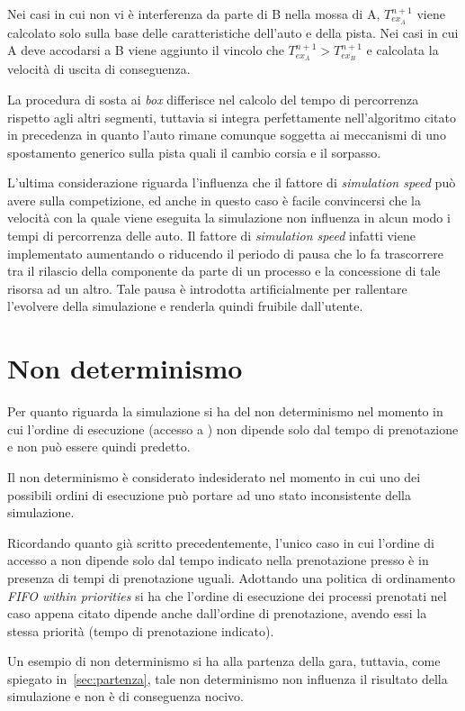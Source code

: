 Nei casi in cui non vi è interferenza da parte di B nella mossa di A, $T_{ex_A}^{n+1}$ viene calcolato solo sulla base delle caratteristiche dell'auto e della pista.
Nei casi in cui A deve accodarsi a B viene aggiunto il vincolo che $T_{ex_A}^{n+1} > T_{ex_B}^{n+1}$ e calcolata la velocità di uscita di conseguenza.

La procedura di sosta ai \textit{box} differisce nel calcolo del tempo di percorrenza rispetto agli altri segmenti, tuttavia si integra perfettamente nell'algoritmo citato in precedenza in quanto l'auto rimane comunque soggetta ai meccanismi di uno spostamento generico sulla pista quali il cambio corsia e il sorpasso.


L'ultima considerazione riguarda l'influenza che il fattore di \textit{simulation speed} può avere sulla competizione, ed anche in questo caso è facile convincersi che la velocità con la quale viene eseguita la simulazione non influenza in alcun modo i tempi di percorrenza delle auto. Il fattore di \textit{simulation speed} infatti viene implementato aumentando o riducendo il periodo di pausa che lo \sched{} fa trascorrere tra il rilascio della componente \track{} da parte di un processo e la concessione di tale risorsa ad un altro. Tale pausa è introdotta artificialmente per rallentare l'evolvere della simulazione e renderla quindi fruibile dall'utente.

\section{Non determinismo}
Per quanto riguarda la simulazione si ha del non determinismo nel momento in cui l'ordine di esecuzione (accesso a \track{}) non dipende solo dal tempo di prenotazione e non può essere quindi predetto.

Il non determinismo è considerato indesiderato nel momento in cui uno dei possibili ordini di esecuzione può portare ad uno stato inconsistente della simulazione.

Ricordando quanto già scritto precedentemente, l'unico caso in cui l'ordine di accesso a \track{} non dipende solo dal tempo indicato nella prenotazione presso \sched{} è in presenza di tempi di prenotazione uguali. Adottando una politica di ordinamento \textit{FIFO within priorities} si ha che l'ordine di esecuzione dei processi prenotati nel caso appena citato dipende anche dall'ordine di prenotazione, avendo essi la stessa priorità (tempo di prenotazione indicato).

Un esempio di non determinismo si ha alla partenza della gara, tuttavia, come spiegato in~\ref{sec:partenza}, tale non determinismo non influenza il risultato della simulazione e non è di conseguenza nocivo.

